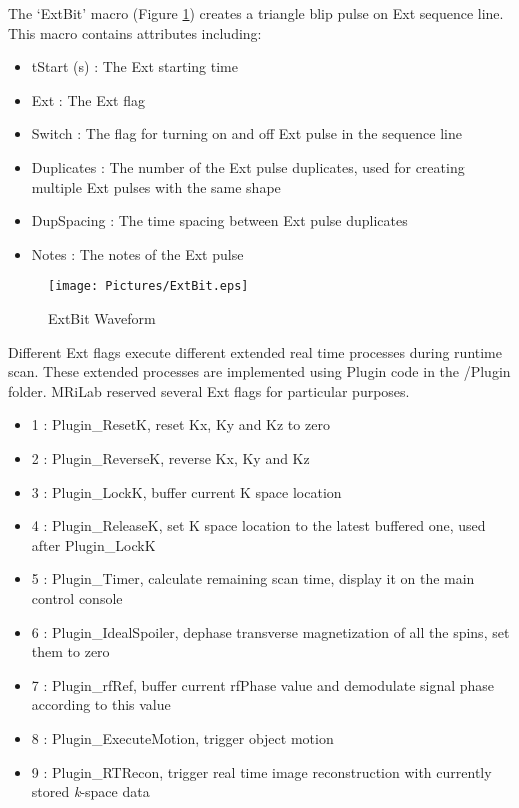 \documentclass{book}%
\begin{document}
The `ExtBit' macro (Figure \ref{fig:ExtBit}) creates a triangle blip pulse on Ext sequence line. This macro contains attributes including:

\begin{itemize}
	\item tStart (s) : The Ext starting time
	\item Ext : The Ext flag
	\item Switch : The flag for turning on and off Ext pulse in the sequence line
	\item Duplicates : The number of the Ext pulse duplicates, used for creating multiple Ext pulses with the same shape
	\item DupSpacing : The time spacing between Ext pulse duplicates
	\item Notes : The notes of the Ext pulse 
\end{itemize}

\begin{figure}[htbp]
	\centering
		\texttt{[image: Pictures/ExtBit.eps]}
	\caption{ExtBit Waveform}
	\label{fig:ExtBit}
\end{figure}


Different Ext flags execute different extended real time processes during runtime scan. These extended processes are implemented using Plugin code in the /Plugin folder. MRiLab reserved several Ext flags for particular purposes. 

\begin{itemize}
	\item 1 : Plugin\_ResetK, reset Kx, Ky and Kz to zero
	\item 2 : Plugin\_ReverseK, reverse Kx, Ky and Kz
	\item 3 : Plugin\_LockK, buffer current K space location
	\item 4 : Plugin\_ReleaseK, set K space location to the latest buffered one, used after Plugin\_LockK
	\item 5 : Plugin\_Timer, calculate remaining scan time, display it on the main control console
	\item 6 : Plugin\_IdealSpoiler, dephase transverse magnetization of all the spins, set them to zero
	\item 7 : Plugin\_rfRef, buffer current rfPhase value and demodulate signal phase according to this value
	\item 8 : Plugin\_ExecuteMotion, trigger object motion
	\item 9 : Plugin\_RTRecon, trigger real time image reconstruction with currently stored \textit{k}-space data
\end{itemize}
\end{document}
